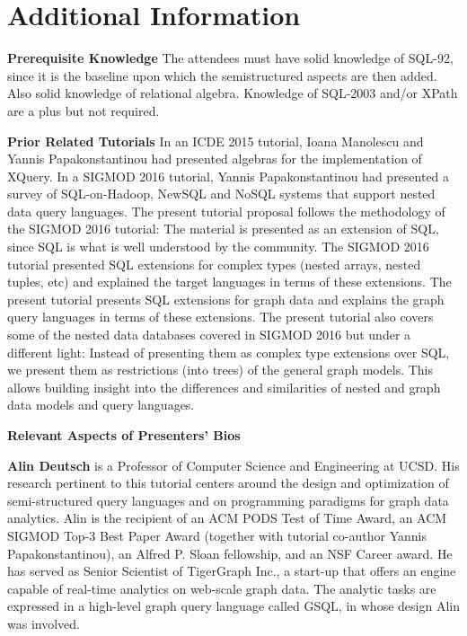 

\section{Additional Information}
\label{sec:duration}

\noindent \textbf{Prerequisite Knowledge} 
\label{sec:audience}
The attendees must have solid knowledge of SQL-92, since it is the baseline upon which the semistructured aspects are then added. Also solid knowledge of relational algebra. Knowledge of SQL-2003 and/or XPath are a plus but not required.

\smallskip
\noindent \textbf{Prior Related Tutorials}
In an ICDE 2015 tutorial, Ioana Manolescu and Yannis Papakonstantinou had presented algebras for the implementation of XQuery. In a SIGMOD 2016 tutorial, Yannis Papakonstantinou had presented a survey of SQL-on-Hadoop, NewSQL and NoSQL systems that support nested data query languages. The present tutorial proposal follows the methodology of the SIGMOD 2016 tutorial: The material is presented as an extension of SQL, since SQL is what is well understood by the community. The SIGMOD 2016 tutorial presented SQL extensions for complex types (nested arrays, nested tuples, etc) and explained the target languages in terms of these extensions. The present tutorial presents SQL extensions for graph data and explains the graph query languages in terms of these extensions. The present tutorial also covers some of the nested data databases covered in SIGMOD 2016 but under a different light: Instead of presenting them as complex type extensions over SQL, we present them as restrictions (into trees) of the general graph models. This allows building insight into the differences and similarities of nested and graph data models and query languages.

\smallskip
\noindent \textbf{Relevant Aspects of Presenters' Bios} 

\textbf{Alin Deutsch} is a Professor of Computer Science and Engineering at UCSD. His research pertinent to this tutorial centers around the design and optimization of semi-structured query languages
and on programming paradigms for graph data analytics. Alin is the recipient of an ACM PODS Test of Time Award, an ACM SIGMOD Top-3 Best Paper Award (together with tutorial co-author Yannis Papakonstantinou), an Alfred P. Sloan fellowship, and an NSF Career award.
He has served as Senior Scientist of TigerGraph Inc., a start-up that offers an engine capable of real-time analytics on web-scale graph data.
The analytic tasks are  expressed in a high-level graph query language called GSQL, in whose design Alin was involved.

